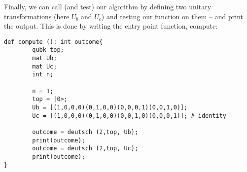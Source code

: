 Finally, we can call (and test) our algorithm by defining two unitary transformations (here $U_b$ and $U_c$) and testing our function on them -- and print the output. This is done by writing the entry point function, \textsf{compute}:
\begin{lstlisting}
def compute (): int outcome{
        qubk top;
        mat Ub;
        mat Uc;
        int n;
        
        n = 1;
        top = |0>;
        Ub = [(1,0,0,0)(0,1,0,0)(0,0,0,1)(0,0,1,0)];
        Uc = [(1,0,0,0)(0,1,0,0)(0,0,1,0)(0,0,0,1)]; # identity

        outcome = deutsch (2,top, Ub);
        print(outcome);
        outcome = deutsch (2,top, Uc);
        print(outcome);
}
\end{lstlisting}
%
